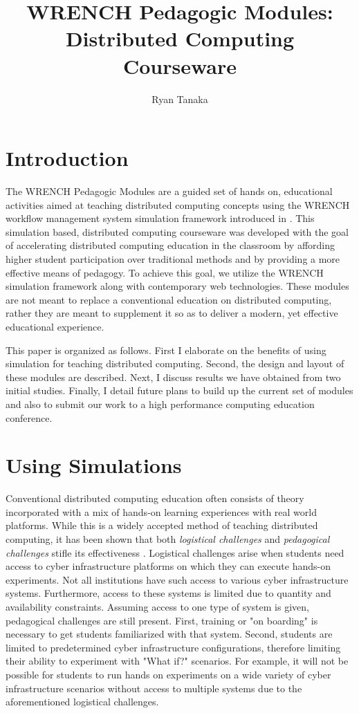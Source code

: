 \documentclass{article}
\begin{document}
\title{WRENCH Pedagogic Modules: Distributed Computing Courseware}
\author{Ryan Tanaka}

\maketitle

\section{Introduction}
The WRENCH Pedagogic Modules are a guided set of hands on, educational
activities aimed at teaching distributed computing concepts using the WRENCH
workflow management system simulation framework introduced in \cite{wrench}.
This simulation based, distributed computing courseware was developed with the
goal of accelerating distributed computing education in the classroom by
affording higher student participation over traditional methods and by providing
a more effective means of pedagogy. To achieve this goal, we utilize the WRENCH
simulation framework along with contemporary web technologies. These modules are
not meant to replace a conventional education on distributed computing, rather
they are meant to supplement it so as to deliver a modern, yet effective
educational  experience.

This paper is organized as follows. First I elaborate on the benefits of using
simulation for teaching  distributed computing. Second, the design and layout of
these modules are described. Next, I discuss results we have obtained from two
initial studies. Finally, I detail future plans to build up the current set of
modules and also to submit our work to a high performance computing education
conference.

\section{Using Simulations}
Conventional distributed computing education often consists of theory
incorporated with a mix of hands-on learning experiences with real world
platforms. While this is a widely accepted method of teaching distributed computing,
it has been shown that both \textit{logistical challenges} and \textit{pedagogical challenges}
stifle its effectiveness \cite{smpi-courseware}. Logistical challenges arise when
students need access to cyber infrastructure platforms on which they can execute
hands-on experiments. Not all institutions have such access to various 
cyber infrastructure systems. Furthermore, access to these systems is limited due
to quantity and availability constraints. Assuming access to one type of system is
given, pedagogical challenges are still present. First, training or "on boarding" is necessary
to get students familiarized with that system. Second, students are limited to 
predetermined cyber infrastructure configurations, therefore limiting their ability to
experiment with "What if?" scenarios. For example, it will not be possible for students to 
run hands on experiments on a wide variety of cyber infrastructure scenarios without
access to multiple systems due to the aforementioned 
logistical challenges. 
\end{document}
